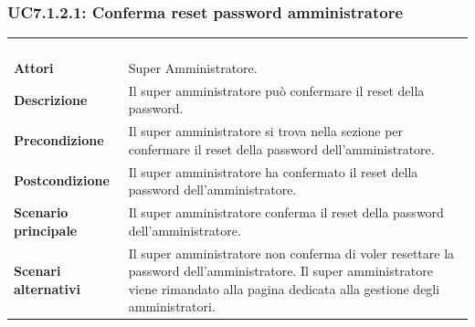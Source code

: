 \subsubsection{UC7.1.2.1: Conferma reset password amministratore}
\label{UC7.1.2.1}
\begin{longtable}{l|p{10cm}}
\rowcolor[gray]{0.8} \multicolumn{2}{c}{} \\
\rowcolor[gray]{0.8} \multicolumn{2}{c}{\textbf{UC7.1.2.1 - Conferma reset password amministratore}} \\
\rowcolor[gray]{0.8} \multicolumn{2}{c}{} \\
\hline
&\\
\textbf{Attori} & Super Amministratore.\\[7pt]
\textbf{Descrizione} & Il super amministratore può confermare il reset della password.\\[7pt]
\textbf{Precondizione} & Il super amministratore si trova nella sezione per confermare il reset della password dell'amministratore.\\[7pt]
\textbf{Postcondizione} & Il super amministratore ha confermato il reset della password dell'amministratore.\\[7pt]
\textbf{Scenario principale} &Il super amministratore conferma il reset della password dell'amministratore.\\[7pt]
\textbf{Scenari alternativi} & Il super amministratore non conferma di voler resettare la password dell'amministratore. Il super amministratore viene rimandato alla pagina dedicata alla gestione degli amministratori.\\[7pt]\hline
\end{longtable}

